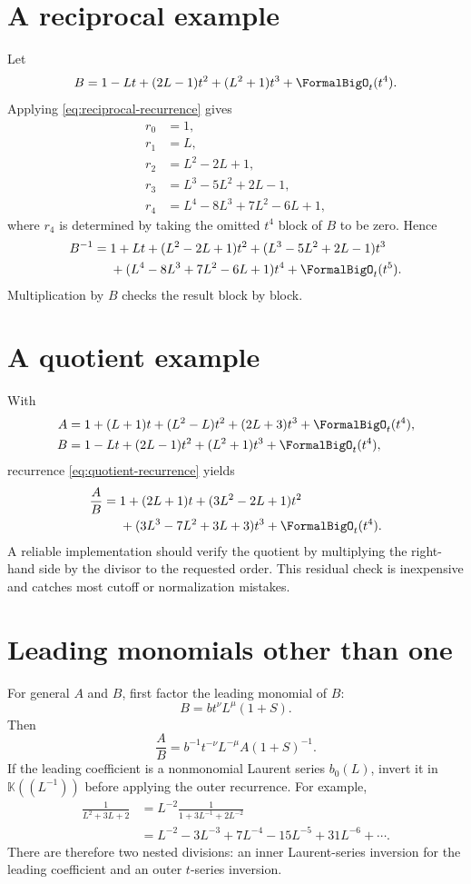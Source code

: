 \documentclass[11pt,oneside]{book}
\theoremstyle{definition}
\theoremstyle{remark}
\newcommand{\K}{\mathbb K}
\begin{document}
\section{A reciprocal example}
Let
\[
 B=1-Lt+(2L-1)t^2+(L^2+1)t^3+\FormalBigO_t(t^4).
\]
Applying \eqref{eq:reciprocal-recurrence} gives
\begin{align*}
 r_0&=1,\\
 r_1&=L,\\
 r_2&=L^2-2L+1,\\
 r_3&=L^3-5L^2+2L-1,\\
 r_4&=L^4-8L^3+7L^2-6L+1,
\end{align*}
where $r_4$ is determined by taking the omitted $t^4$ block of $B$ to be
zero.  Hence
\begin{align}\label{eq:reciprocal-example}
 B^{-1}={}&1+Lt+(L^2-2L+1)t^2
 +(L^3-5L^2+2L-1)t^3\notag\\
 &+(L^4-8L^3+7L^2-6L+1)t^4+\FormalBigO_t(t^5).
\end{align}
Multiplication by $B$ checks the result block by block.

\section{A quotient example}
With
\begin{align*}
 A&=1+(L+1)t+(L^2-L)t^2+(2L+3)t^3+\FormalBigO_t(t^4),\\
 B&=1-Lt+(2L-1)t^2+(L^2+1)t^3+\FormalBigO_t(t^4),
\end{align*}
recurrence \eqref{eq:quotient-recurrence} yields
\begin{align}\label{eq:quotient-example}
 \frac AB={}&1+(2L+1)t+(3L^2-2L+1)t^2\notag\\
 &+(3L^3-7L^2+3L+3)t^3+\FormalBigO_t(t^4).
\end{align}
A reliable implementation should verify the quotient by multiplying the
right-hand side by the divisor to the requested order.  This residual check
is inexpensive and catches most cutoff or normalization mistakes.

\section{Leading monomials other than one}
For general $A$ and $B$, first factor the leading monomial of $B$:
\[
 B=b t^\nu L^\mu(1+S).
\]
Then
\[
 \frac AB=b^{-1}t^{-\nu}L^{-\mu}A(1+S)^{-1}.
\]
If the leading coefficient is a nonmonomial Laurent series $b_0(L)$, invert
it in $\K((L^{-1}))$ before applying the outer recurrence.  For example,
\begin{align*}
 \frac{1}{L^2+3L+2}
 &=L^{-2}\frac1{1+3L^{-1}+2L^{-2}}\\
 &=L^{-2}-3L^{-3}+7L^{-4}-15L^{-5}+31L^{-6}+\cdots.
\end{align*}
There are therefore two nested divisions: an inner Laurent-series inversion
for the leading coefficient and an outer $t$-series inversion.
\end{document}
